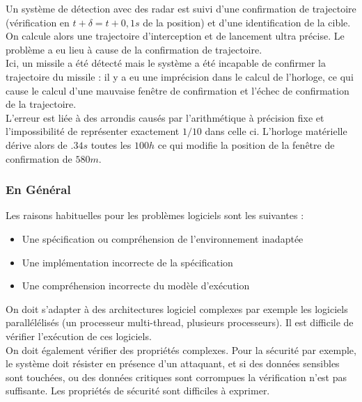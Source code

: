 \documentclass{cours}
\begin{document}
Un système de détection avec des radar est suivi d'une confirmation de trajectoire (vérification en $t + \delta =t + 0,1s$ de la position) et d'une identification de la cible. On calcule alors une trajectoire d'interception et de lancement ultra précise. Le problème a eu lieu à cause de la confirmation de trajectoire.\\
Ici, un missile a été détecté mais le système a été incapable de confirmer la trajectoire du missile : il y a eu une imprécision dans le calcul de l'horloge, ce qui cause le calcul d'une mauvaise fenêtre de confirmation et l'échec de confirmation de la trajectoire.\\
L'erreur est liée à des arrondis causés par l'arithmétique à précision fixe et l'impossibilité de représenter exactement $1/10$ dans celle ci. L'horloge matérielle dérive alors de $.34s$ toutes les $100h$ ce qui modifie la position de la fenêtre de confirmation de $580m$.


\subsubsection{En Général}
Les raisons habituelles pour les problèmes logiciels sont les suivantes :
\begin{itemize}
	\item Une spécification ou compréhension de l'environnement inadaptée
	\item Une implémentation incorrecte de la spécification
	\item Une compréhension incorrecte du modèle d'exécution
\end{itemize}
On doit s'adapter à des architectures logiciel complexes par exemple les logiciels parallélélisés (un processeur multi-thread, plusieurs processeurs). Il est difficile de vérifier l'exécution de ces logiciels.\\
On doit également vérifier des propriétés complexes. Pour la sécurité par exemple, le système doit résister en présence d'un attaquant, et si des données sensibles sont touchées, ou des données critiques sont corrompues la vérification n'est pas suffisante. Les propriétés de sécurité sont difficiles à exprimer.
\end{document}
